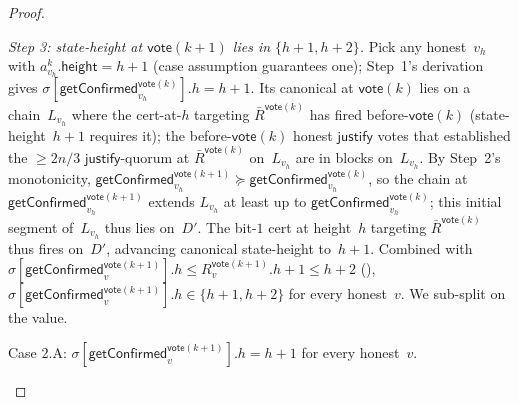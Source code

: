 \ifx\litemode\undefined\documentclass{article}\fi
\newcommand{\height}{\mathsf{height}}
\newcommand{\just}{\ensuremath{\mathsf{justify}}\xspace}
\newcommand{\vote}{\mathsf{vote}}
\newcommand{\comm}[1]{\bar{#1}}
\newcommand{\getConfirmed}{\textsf{getConfirmed}\xspace}
\theoremstyle{plain}
\theoremstyle{definition}
\theoremstyle{remark}
\begin{document}
\begin{proof}
\begin{description}
\emph{Step 3: state-height at $\vote(k+1)$ lies in $\{h+1, h+2\}$.}
Pick any honest~$v_h$ with $a^k_{v_h}.\height = h+1$ (case assumption guarantees one); Step~1's derivation gives $\sigma[\getConfirmed_{v_h}^{\vote(k)}].h = h+1$. Its canonical at $\vote(k)$ lies on a chain~$L_{v_h}$ where the cert-at-$h$ targeting $\comm{R}^{\vote(k)}$ has fired before-$\vote(k)$ (state-height~$h+1$ requires it); the before-$\vote(k)$ honest \just votes that established the $\geq 2n/3$ \just-quorum at $\comm{R}^{\vote(k)}$ on~$L_{v_h}$ are in blocks on~$L_{v_h}$. By Step~2's monotonicity, $\getConfirmed_{v_h}^{\vote(k+1)} \succeq \getConfirmed_{v_h}^{\vote(k)}$, so the chain at $\getConfirmed_{v_h}^{\vote(k+1)}$ extends $L_{v_h}$ at least up to $\getConfirmed_{v_h}^{\vote(k)}$; this initial segment of~$L_{v_h}$ thus lies on~$D'$. The bit-$1$ cert at height~$h$ targeting $\comm{R}^{\vote(k)}$ thus fires on~$D'$, advancing canonical state-height to~$h+1$. Combined with $\sigma[\getConfirmed_v^{\vote(k+1)}].h \leq R_v^{\vote(k+1)}.h + 1 \leq h+2$ (), $\sigma[\getConfirmed_v^{\vote(k+1)}].h \in \{h+1, h+2\}$ for every honest~$v$. We sub-split on the value.

\begin{description}
\item[{Case 2.A: $\sigma[\getConfirmed_v^{\vote(k+1)}].h = h+1$ for every honest~$v$.}]\hfill

\begin{figure}[H]
\centering
{}
\end{figure}
\end{description}
\end{description}
\end{proof}
\end{document}

